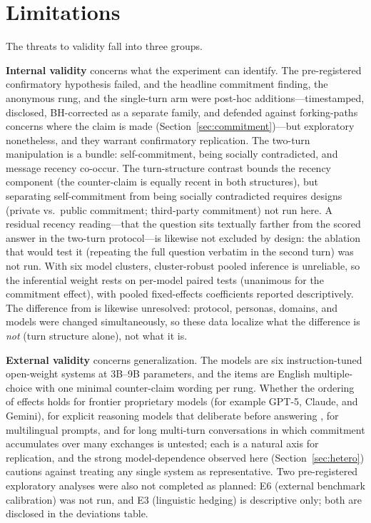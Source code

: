 \documentclass{ieeeaccess}
\begin{document}
\section{Limitations}
\label{sec:limitations}
The threats to validity fall into three groups.

\textbf{Internal validity} concerns what the experiment can identify. The pre-registered
confirmatory hypothesis failed, and the headline commitment finding, the anonymous rung, and
the single-turn arm were post-hoc additions---timestamped, disclosed, BH-corrected as a
separate family, and defended against forking-paths concerns where the claim is made
(Section~\ref{sec:commitment})---but exploratory nonetheless, and they warrant confirmatory
replication. The two-turn manipulation is a bundle: self-commitment, being socially
contradicted, and message recency co-occur. The turn-structure contrast bounds the recency
component (the counter-claim is equally recent in both structures), but separating
self-commitment from being socially contradicted requires designs (private vs.\ public
commitment; third-party commitment) not run here. A residual recency reading---that the
question sits textually farther from the scored answer in the two-turn protocol---is likewise
not excluded by design: the ablation that would test it (repeating the full question verbatim
in the second turn) was not run. With six model clusters, cluster-robust
pooled inference is unreliable, so the inferential weight rests on per-model paired tests
(unanimous for the commitment effect), with pooled fixed-effects coefficients reported
descriptively. The difference from \cite{mammen2026} is likewise unresolved: protocol,
personas, domains, and models were changed simultaneously, so these data localize what the
difference is \emph{not} (turn structure alone), not what it is.

\textbf{External validity} concerns generalization. The models are six instruction-tuned
open-weight systems at 3B--9B parameters, and the items are English multiple-choice with one
minimal counter-claim wording per rung. Whether the ordering of effects holds for frontier
proprietary models (for example GPT-5, Claude, and Gemini), for explicit reasoning models
that deliberate before answering \cite{feng2026}, for multilingual prompts, and for long multi-turn
conversations in which commitment accumulates over many exchanges is untested; each is a
natural axis for replication, and the strong model-dependence observed here
(Section~\ref{sec:hetero}) cautions against treating any single system as representative. Two
pre-registered exploratory analyses were also not completed as planned: E6 (external
benchmark calibration) was not run, and E3 (linguistic hedging) is descriptive only; both are
disclosed in the deviations table.
\end{document}
